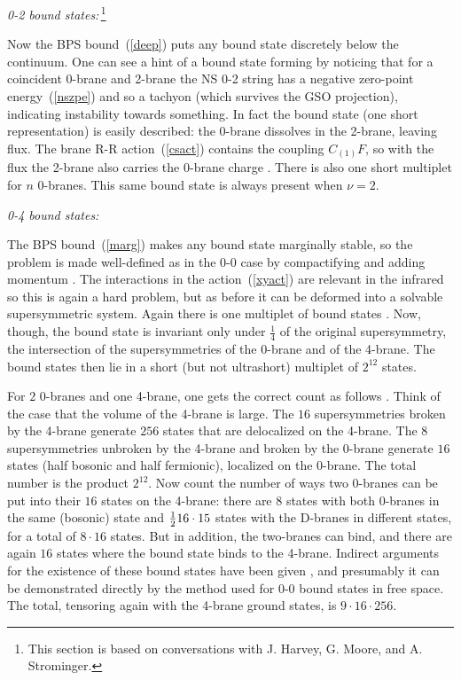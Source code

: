 \documentclass[12pt]{article}
\def\ha{{\textstyle{1\over 2}}}
\begin{document}
{\it 0-2 bound states:}\,\footnote
{This section is based on conversations with 
J. Harvey, G. Moore, and A. Strominger.}

Now the BPS bound~(\ref{deep}) puts any bound
state discretely below the continuum.  One can see a hint of a bound state
forming by noticing that for a coincident 0-brane and 2-brane the NS 0-2
string has a negative zero-point energy~(\ref{nszpe}) and so a tachyon
(which survives the GSO projection), indicating instability towards
something.  In fact the bound state (one short representation) is easily
described: the 0-brane dissolves in the 2-brane, leaving  flux.  The brane R-R
action~(\ref{csact}) contains the coupling
$C_{(1)} F$, so with the flux the 2-brane also carries the 0-brane
charge \cite{towndf}. There is also one short multiplet for $n$ 0-branes.  This
same bound state is always present when $\nu = 2$.

{\it 0-4 bound states:} 

The BPS bound~(\ref{marg}) makes any bound state
marginally stable, so the problem is made well-defined as in the 0-0 case by
compactifying and adding momentum \cite{senbound2}.  The interactions in the
action~(\ref{xyact}) are relevant in the infrared so this is again a hard
problem, but as before it can be deformed into a solvable supersymmetric
system.  Again there is one multiplet of bound states \cite{senbound2}.
Now, though, the bound state is invariant only under $\frac{1}{4}$ of the
original supersymmetry, the intersection of the supersymmetries of the
0-brane and of the 4-brane.  The bound states then lie in a short (but not
ultrashort) multiplet of $2^{12}$ states.

For $2$ 0-branes and one 4-brane, one gets the correct count as
follows \cite{vafa1}. Think of the case that the volume of the 4-brane is
large.  The $16$ supersymmetries broken by the 4-brane generate $256$ states
that are  delocalized on the 4-brane.  The 8 supersymmetries unbroken by the
4-brane  and broken by the 0-brane generate $16$ states (half bosonic and
half fermionic), localized on the 0-brane. The total number is the product
$2^{12}$.  Now count the number of ways two 0-branes can be put into their
$16$ states on the 4-brane: there are $8$ states with both 0-branes in the
same (bosonic) state and $\ha 16\cdot 15$ states with the D-branes in
different states, for a total of $8\cdot 16$ states.  But in addition, the
two-branes can bind, and there are again $16$ states where the bound state
binds to the 4-brane.  Indirect arguments for the existence of these bound
states have been given \cite{vafa1}, and presumably it
can be demonstrated directly by the
method used for 0-0 bound states in
free space.  The total,
tensoring again with the 4-brane ground states, is $9 \cdot 16 \cdot 256$.
\end{document}
